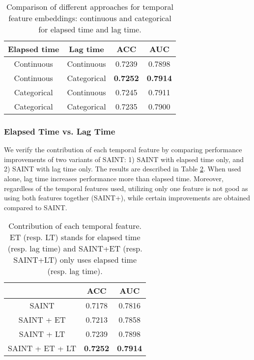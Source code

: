 \begin{table}[ht]
\caption{Comparison of different approaches for temporal feature embeddings: continuous and categorical for elapsed time and lag time.}
\centering
\begin{tabular}{cccc}
\toprule
Elapsed time & Lag time & ACC & AUC \\ 
\midrule
Continuous & Continuous & 0.7239 & 0.7898 \\
Continuous & Categorical & \textbf{0.7252} & \textbf{0.7914} \\
Categorical & Continuous & 0.7245 & 0.7911 \\
Categorical & Categorical & 0.7235 & 0.7900 \\
\bottomrule
\end{tabular}
\label{tab:embedding}
\end{table}

\subsubsection{Elapsed Time vs. Lag Time}
We verify the contribution of each temporal feature by comparing performance improvements of two variants of SAINT: 1) SAINT with elapsed time only, and 2) SAINT with lag time only.
The results are described in Table \ref{tab:feature}.
When used alone, lag time increases performance more than elapsed time.
Moreover, regardless of the temporal features used, utilizing only one feature is not good as using both features together (SAINT+), while certain improvements are obtained compared to SAINT.

\begin{table}[ht]
\caption{Contribution of each temporal feature.
ET (resp. LT) stands for elapsed time (resp. lag time) and SAINT+ET (resp. SAINT+LT) only uses elapsed time (resp. lag time).}
\centering
\begin{tabular}{ccc}
\toprule
 & ACC & AUC \\ 
\midrule
SAINT & 0.7178 & 0.7816 \\
SAINT + ET & 0.7213 & 0.7858 \\
SAINT + LT & 0.7239 & 0.7898 \\
SAINT + ET + LT & \textbf{0.7252} & \textbf{0.7914} \\
\bottomrule
\end{tabular}
\label{tab:feature}
\end{table}

